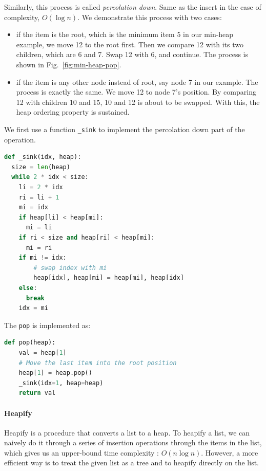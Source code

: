 \documentclass[../main.tex]{subfiles}
\begin{document}
Similarly, this process is called \textit{percolation down}. Same as the insert in the case of complexity, $O(\log n)$. We demonstrate this process with two cases:
\begin{itemize}
    \item if the item is the root, which is the minimum item $5$ in our min-heap example,  we move 12 to the root first. Then we compare 12 with its two children, which are 6 and 7. Swap 12 with 6, and continue. The process is shown in Fig.~\ref{fig:min-heap-pop}.
    \item if the item is any other node instead of root, say node 7 in our example. The process is exactly the same. We move 12 to node 7's position. By comparing 12 with children 10 and 15, 10 and 12 is about to be swapped. With this, the heap ordering property is sustained. 
\end{itemize}

We first use a function \texttt{\_sink} to implement the percolation down part of the operation. 
\begin{lstlisting}[language=Python]
def _sink(idx, heap): 
  size = len(heap)
  while 2 * idx < size:
    li = 2 * idx
    ri = li + 1
    mi = idx
    if heap[li] < heap[mi]:
      mi = li
    if ri < size and heap[ri] < heap[mi]:
      mi = ri
    if mi != idx:
        # swap index with mi
        heap[idx], heap[mi] = heap[mi], heap[idx]
    else:
      break
    idx = mi
\end{lstlisting}
The \texttt{pop} is implemented as:
\begin{lstlisting}[language=Python]
def pop(heap):
    val = heap[1]
    # Move the last item into the root position
    heap[1] = heap.pop()
    _sink(idx=1, heap=heap)
    return val
\end{lstlisting}


\paragraph{Heapify}  Heapify is a procedure that converts a list to a heap.  To heapify a list, we can naively do it through a series of insertion operations through the items in the list, which gives us an upper-bound time complexity : $O(n\log n)$. However, a more efficient way is to treat the given list as a tree and to heapify directly on the list. %
\end{document}
